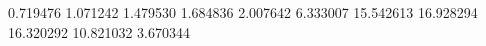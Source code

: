 0.719476
1.071242
1.479530
1.684836
2.007642
6.333007
15.542613
16.928294
16.320292
10.821032
3.670344
